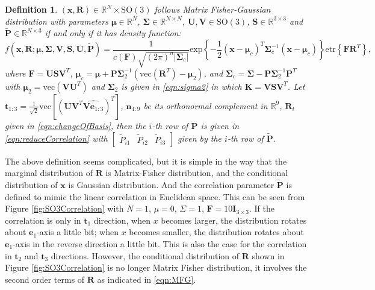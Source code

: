 \documentclass[12pt]{article}
\newtheorem{definition}{Definition}
\begin{document}
\begin{definition}
	$(\bm{x},\mathbf{R})\in\mathbb{R}^N\times\mathrm{SO}(3)$ follows Matrix Fisher-Gaussian distribution with parameters $\bm{\mu}\in\mathbb{R}^N$, $\mathbf{\Sigma}\in\mathbb{R}^{N\times N}$, $\mathbf{U},\mathbf{V}\in\mathrm{SO}(3)$, $\mathbf{S}\in\mathbb{R}^{3\times 3}$ and $\tilde{\mathbf{P}}\in\mathbb{R}^{N\times 3}$ if and only if it has density function:
	\begin{equation} \label{eqn:MFG}
		f(\bm{x},\mathbf{R};\bm{\mu},\mathbf{\Sigma},\mathbf{V},\mathbf{S},\mathbf{U},\tilde{\mathbf{P}}) = \frac{1}{c(\mathbf{F})\sqrt{(2\pi)^n|\mathbf{\Sigma}_c|}} \mathrm{exp}\left\{-\frac{1}{2}(\bm{x}-\bm{\mu}_c)^T\mathbf{\Sigma}_c^{-1}(\bm{x}-\bm{\mu}_c)\right\} \mathrm{etr}\left\{\mathbf{F}\mathbf{R}^T\right\},
	\end{equation}
	where $\mathbf{F} = \mathbf{U}\mathbf{S}\mathbf{V}^T$, $\bm{\mu}_c = \bm{\mu}+\mathbf{P}\mathbf{\Sigma}_2^{-1}(\mathrm{vec}(\mathbf{R}^T)-\bm{\mu}_2)$, and $\mathbf{\Sigma}_c = \mathbf{\Sigma}-\mathbf{P}\mathbf{\Sigma}_2^{-1}\mathbf{P}^T$ with $\bm{\mu}_2=\mathrm{vec}(\mathbf{V}\mathbf{U}^T)$ and $\mathbf{\Sigma}_2$ is given in \eqref{eqn:sigma2} in which $\mathbf{K} = \mathbf{V}\mathbf{S}\mathbf{V}^T$.
	Let $\bm{t}_{1:3}=\frac{1}{\sqrt{2}} \mathrm{vec}[(\mathbf{U}\mathbf{V}^T\widehat{\mathbf{V}\bm{e}_{1:3}})^T]$, $\bm{n}_{4:9}$ be its orthonormal complement in $\mathbb{R}^9$, $\mathbf{R}_t$ given in \eqref{eqn:changeOfBasis}, then the $i$-th row of $\mathbf{P}$ is given in \eqref{eqn:reduceCorrelation} with $[\begin{matrix}\tilde{P}_{i1} & \tilde{P}_{i2} & \tilde{P}_{i3}\end{matrix}]$ given by the $i$-th row of $\tilde{\mathbf{P}}$.
\end{definition}

The above definition seems complicated, but it is simple in the way that the marginal distribution of $\mathbf{R}$ is Matrix-Fisher distribution, and the conditional distribution of $\bm{x}$ is Gaussian distribution.
And the correlation parameter $\tilde{\mathbf{P}}$ is defined to mimic the linear correlation in Euclidean space.
This can be seen from Figure \ref{fig:SO3Correlation} with $N=1$, $\mu=0$, $\Sigma=1$, $\mathbf{F}=10\mathbf{I}_{3\times 3}$.
If the correlation is only in $\bm{t}_1$ direction, when $x$ becomes larger, the distribution rotates about $\bm{e}_1$-axis a little bit; when $x$ becomes smaller, the distribution rotates about $\bm{e}_1$-axis in the reverse direction a little bit.
This is also the case for the correlation in $\bm{t}_2$ and $\bm{t}_3$ directions.
However, the conditional distribution of $\mathbf{R}$ shown in Figure \ref{fig:SO3Correlation} is no longer Matrix Fisher distribution, it involves the second order terms of $\mathbf{R}$ as indicated in \eqref{eqn:MFG}.
\end{document}
